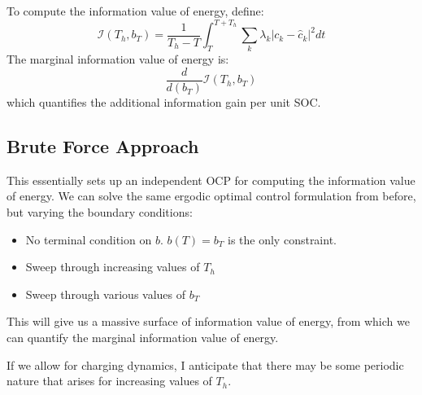 To compute the information value of energy, define:
\begin{equation}
    \mathcal{I}(T_h, b_T) = \frac{1}{T_h - T} \int_T^{T+T_h} \sum_k \lambda_k \left| c_k - \hat{c}_k \right|^2 dt
\end{equation}
The marginal information value of energy is:
\begin{equation}
    \frac{d}{d (b_T)} \mathcal{I}(T_h, b_T)
\end{equation}
which quantifies the additional information gain per unit SOC.

\subsection{Brute Force Approach}
This essentially sets up an independent OCP for computing the information value of energy. We can solve the same ergodic optimal control formulation from before, but varying the boundary conditions:
\begin{itemize}
    \item No terminal condition on $b$. $b(T) = b_T$ is the only constraint.
    \item Sweep through increasing values of $T_h$
    \item Sweep through various values of $b_T$
\end{itemize}

This will give us a massive surface of information value of energy, from which we can quantify the marginal information value of energy.

If we allow for charging dynamics, I anticipate that there may be some periodic nature that arises for increasing values of $T_h$.